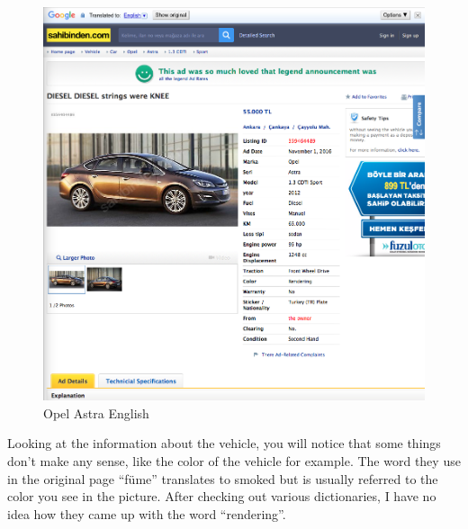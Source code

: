\documentclass[10pt,letterpaper,bibliography=totoc]{scrartcl}
\begin{document}
\begin{figure}[h!]
\centering
\label{fig:car_ad_english}
\includegraphics[scale=.5]{opel_english.png}
\caption{Opel Astra English}
\end{figure}

Looking at the information about the vehicle, you will notice that some things don't make any sense, like the color of the vehicle for example. The word they use in the original page ``füme'' translates to smoked but is usually referred to the color you see in the picture. After checking out various dictionaries, I have no idea how they came up with the word ``rendering''. 
\end{document}
